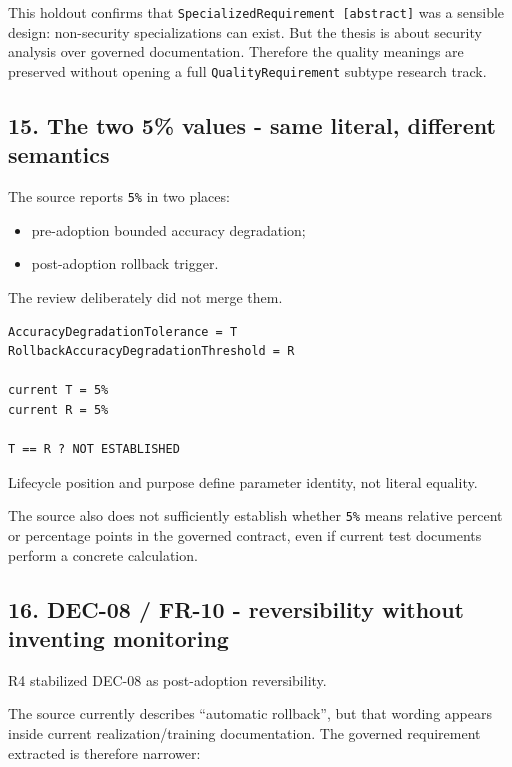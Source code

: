 \documentclass[11pt,a4paper]{article}
\providecommand{\tightlist}{\setlength{\itemsep}{0pt}\setlength{\parskip}{0pt}}
\begin{document}
This holdout confirms that
\texttt{SpecializedRequirement\ {[}abstract{]}} was a sensible design:
non-security specializations can exist. But the thesis is about security
analysis over governed documentation. Therefore the quality meanings are
preserved without opening a full \texttt{QualityRequirement} subtype
research track.

\subsection{15. The two 5\% values - same literal, different
semantics}\label{15-the-two-5-values---same-literal-different-semantics}

The source reports \texttt{5\%} in two places:

\begin{itemize}
\tightlist
\item
  pre-adoption bounded accuracy degradation;
\item
  post-adoption rollback trigger.
\end{itemize}

The review deliberately did not merge them.

\begin{verbatim}
AccuracyDegradationTolerance = T
RollbackAccuracyDegradationThreshold = R

current T = 5%
current R = 5%

T == R ? NOT ESTABLISHED
\end{verbatim}

Lifecycle position and purpose define parameter identity, not literal
equality.

The source also does not sufficiently establish whether \texttt{5\%}
means relative percent or percentage points in the governed contract,
even if current test documents perform a concrete calculation.

\subsection{16. DEC-08 / FR-10 - reversibility without inventing
monitoring}\label{16-dec-08--fr-10---reversibility-without-inventing-monitoring}

R4 stabilized DEC-08 as post-adoption reversibility.

The source currently describes ``automatic rollback'', but that wording
appears inside current realization/training documentation. The governed
requirement extracted is therefore narrower:
\end{document}
